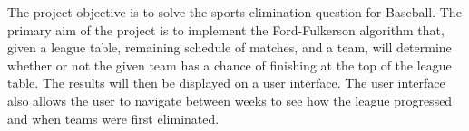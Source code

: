 The project objective is to solve the sports elimination question for Baseball.
The primary aim of the project is to implement the
Ford-Fulkerson algorithm that, given a league table, remaining schedule of
matches, and a team, will determine whether or not the given team has a
chance of finishing at the top of the league table. The results will then
be displayed on a user interface. The user interface also allows the user to 
navigate between weeks to see how the league progressed and when teams were 
first eliminated.